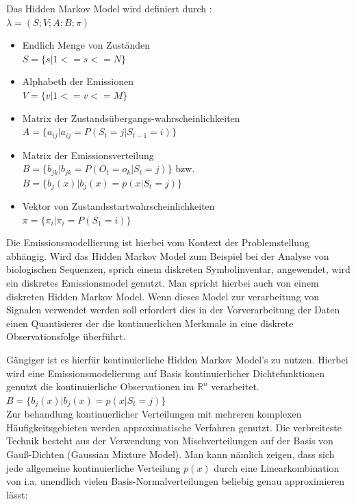 Das Hidden Markov Model wird definiert durch \cite[68]{mmmFink}:\\ 
\( \lambda = (S;V;A;B;\pi)\)
\begin{itemize}
     \item Endlich Menge von Zuständen \\
           \( S = \{ s | 1 <= s <= N \} \)
     \item Alphabeth der Emissionen \\
           \( V = \{ v | 1 <= v <= M \} \)
     \item Matrix der Zustandsübergangs-wahrscheinlichkeiten \\
           \( A = \{ a_{ij} | a_{ij} = P(S_t = j | S_{t-1} = i) \} \)
     \item Matrix der Emissionsverteilung \\
           \( B = \{ b_{jk} | b_{jk} = P(O_t = o_k | S_t = j) \} \) bzw. \( B =
           \{ b_{j}(x) | b_{j}(x) = p(x|S_t = j) \} \)
     \item Vektor von Zustandsstartwahrscheinlichkeiten \\
           \( \pi = \{ \pi_i | \pi_i = P(S_1 = i) \} \) 
\end{itemize}

Die Emissionsmodellierung ist hierbei vom Kontext der Problemstellung abhängig. Wird das Hidden Markov Model zum Beispiel bei der Analyse von biologischen Sequenzen, sprich einem diskreten Symbolinventar, angewendet, wird ein diskretes  Emissionsmodel genutzt. Man spricht hierbei auch von einem diskreten Hidden Markov Model. Wenn dieses Model zur verarbeitung von Signalen verwendet werden soll erfordert dies in der Vorverarbeitung der Daten einen Quantisierer der die  kontinuerlichen Merkmale in eine diskrete Observationsfolge überführt. 

Gängiger ist es hierfür kontinuierliche Hidden Markov Model's zu nutzen. Hierbei wird eine Emissionsmodelierung auf Basis kontinuierlicher Dichtefunktionen genutzt die kontinuierliche Observationen im \(\mathbb{R}^n\) verarbeitet.\\ 
\( B =\{ b_{j}(x) | b_{j}(x) = p(x|S_t = j) \} \)\\
Zur behandlung kontinuerlicher Verteilungen mit mehreren komplexen Häufigkeitsgebieten werden approximatische Verfahren genutzt. Die verbreiteste Technik besteht aus der Verwendung von Mischverteilungen auf der Basis von Gauß-Dichten (Gaussian Mixture Model). Man kann nämlich zeigen, dass sich jede allgemeine kontinuierliche Verteilung \(p(x)\) durch eine Linearkombination von i.a. unendlich vielen Basis-Normalverteilungen beliebig genau approximieren lässt\cite[69]{mmmFink}:
 
